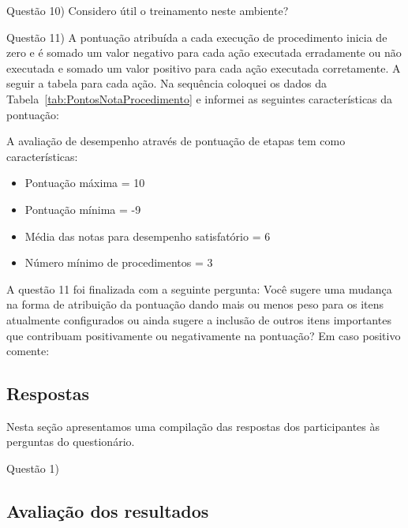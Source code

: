 Questão 10) Considero útil o treinamento neste ambiente?

Questão 11) A pontuação atribuída a cada execução de procedimento inicia de zero e é somado um valor negativo para cada ação executada erradamente ou não executada e somado um valor positivo para cada ação executada corretamente. A seguir a tabela para cada ação. Na sequência coloquei os dados da Tabela~\ref{tab:PontosNotaProcedimento} e informei as seguintes características da pontuação:

A avaliação de desempenho através de pontuação de etapas tem como características:
\begin{itemize}
   \item Pontuação máxima = 10
   \item Pontuação mínima = -9
   \item Média das notas para desempenho satisfatório = 6
   \item Número mínimo de procedimentos = 3
 \end{itemize}

A questão 11 foi finalizada com a seguinte pergunta: Você sugere uma mudança na forma de atribuição da pontuação dando mais ou menos peso para os itens atualmente configurados ou ainda sugere a inclusão de outros itens importantes que contribuam positivamente ou negativamente na pontuação? Em caso positivo comente:

\subsection{Respostas}
\label{sec:respostasEspecialistas}

Nesta seção apresentamos uma compilação das respostas dos participantes às perguntas do questionário.

Questão 1) 

\subsection{Avaliação dos resultados}
\label{sec:avaliacaoEspecialistas}